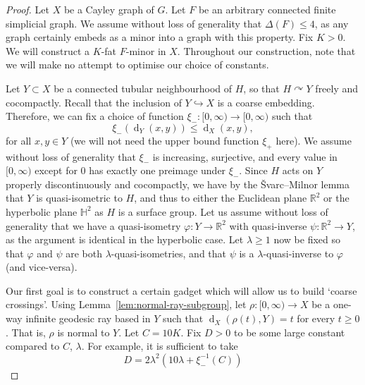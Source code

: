 \documentclass[10pt,a4paper]{amsart}
\DeclareMathOperator{\dist}{d}
\newcommand{\R}{\mathbb{R}}
\newcommand{\into}{\hookrightarrow}
\newcommand{\actson}{\curvearrowright}
\theoremstyle{definition}
\begin{document}
\begin{proof}

Let $X$ be a Cayley graph of $G$. 
Let $F$ be an arbitrary connected finite simplicial graph. We assume without loss of generality that $\Delta(F) \leq 4$, as any graph certainly embeds as a minor into a graph with this property. 
Fix $K > 0$. We will construct a $K$-fat $F$-minor in $X$. Throughout our construction, note that we will make no attempt to optimise our choice of constants. 



    Let $Y \subset X$ be a connected tubular neighbourhood of $H$, so that $H \actson Y$ freely and cocompactly. Recall that the inclusion of $Y \into X$ is a coarse embedding. Therefore, we can fix a choice of function $\xi_- : [0, \infty) \to [0,\infty)$ such that 
    $$
        \xi_-(\dist_Y(x,y)) \leq \dist_X(x,y),
    $$
    for all $x,y \in Y$ (we will not need the upper bound function $\xi_+$ here). 
    We assume without loss of generality that $\xi_-$ is increasing, surjective, and every value in $[0,\infty)$ except for 0 has exactly one preimage under $\xi_-$. 
    Since $H$ acts on $Y$ properly discontinuously and cocompactly, we have by the Švarc–Milnor lemma that $Y$ is quasi-isometric to $H$, and thus to either the Euclidean plane $\R^2$ or the hyperbolic plane $\mathbb H^2$ as $H$ is a surface group. Let us assume without loss of generality that we have a quasi-isometry $\varphi : Y \to \R^2$ with quasi-inverse $\psi : \R^2 \to Y$, as the argument is identical in the hyperbolic case.
    Let $\lambda \geq 1 $ now be fixed so that $\varphi$ and $\psi$ are both $\lambda$-quasi-isometries, and that $\psi$ is a $\lambda$-quasi-inverse to $\varphi$ (and vice-versa).
    
    Our first goal is to construct a certain gadget which will allow us to build `coarse crossings'. 
    Using Lemma~\ref{lem:normal-ray-subgroup}, let $\rho : [0, \infty) \to X$ be a one-way infinite geodesic ray based in $Y$ such that $\dist_X(\rho(t), Y) = t$ for every $t \geq 0$. That is, $\rho$ is normal to $Y$.
    Let $C = 10K$. 
	Fix $D > 0$ to be some large constant compared to $C$, $\lambda$. For example, it is sufficient to take 
    $$
    D = 2\lambda^2(10\lambda + \xi_-^{-1}(C))
    $$
		

\end{proof}
\end{document}

